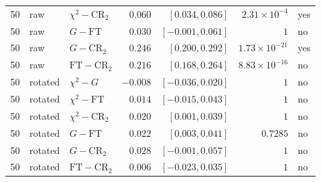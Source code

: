 \begin{table}[t]
\begin{tabular}{lllrrrl}
50 & raw & $\chi^2-\mathrm{CR}_2$ & $0.060$ & $[0.034, 0.086]$ & $2.31\!\times\!10^{-4}$ & yes \\
50 & raw & $G-\mathrm{FT}$ & $0.030$ & $[-0.001, 0.061]$ & $1$ & no \\
50 & raw & $G-\mathrm{CR}_2$ & $0.246$ & $[0.200, 0.292]$ & $1.73\!\times\!10^{-21}$ & yes \\
50 & raw & $\mathrm{FT}-\mathrm{CR}_2$ & $0.216$ & $[0.168, 0.264]$ & $8.83\!\times\!10^{-16}$ & no \\
50 & rotated & $\chi^2-G$ & $-0.008$ & $[-0.036, 0.020]$ & $1$ & no \\
50 & rotated & $\chi^2-\mathrm{FT}$ & $0.014$ & $[-0.015, 0.043]$ & $1$ & no \\
50 & rotated & $\chi^2-\mathrm{CR}_2$ & $0.020$ & $[0.001, 0.039]$ & $1$ & no \\
50 & rotated & $G-\mathrm{FT}$ & $0.022$ & $[0.003, 0.041]$ & $0.7285$ & no \\
50 & rotated & $G-\mathrm{CR}_2$ & $0.028$ & $[-0.001, 0.057]$ & $1$ & no \\
50 & rotated & $\mathrm{FT}-\mathrm{CR}_2$ & $0.006$ & $[-0.023, 0.035]$ & $1$ & no \\
\bottomrule
\end{tabular}
\end{table}

